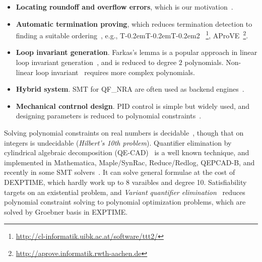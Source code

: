 \documentclass[runningheads,a4paper,oribibl]{llncs}
\newcommand\TTTT{%
 \textsf{T\kern-0.2em\raisebox{-0.3em}T\kern-0.2emT\kern-0.2em\raisebox{-0.3em}2}%
}
\begin{document}
\begin{itemize}
\item {\bf Locating roundoff and overflow errors}, 
which is our motivation~\cite{Ngoc:2009:ORE:1685167.1685421,Ngoc:2010:CRE:1858996.1859056}. 

\item {\bf Automatic termination proving}, 
which reduces termination detection to finding a suitable ordering~\cite{Lucas:2008:CCS:1361735.1361760}, 
e.g., \TTTT~\footnote{\url{http://cl-informatik.uibk.ac.at/software/ttt2/}}, 
AProVE~\footnote{\url{http://aprove.informatik.rwth-aachen.de}}. 

\item {\bf Loop invariant generation}. 
Farkas's lemma is a popular approach in linear loop invariant generation~\cite{Colon}, 
and is reduced to degree $2$ polynomials. 
Non-linear loop invariant~\cite{Sankaranarayanan:2004:NLI:982962.964028} requires more complex polynomials.

\item {\bf Hybrid system}. SMT for QF\_NRA are often used as backend engines~\cite{Sankaranarayanan04constructinginvariants}. 

\item {\bf Mechanical contrnol design}. 
PID control is simple but widely used, and designing parameters is 
reduced to polynomial constraints~\cite{control}. 
\end{itemize}	

Solving polynomial constraints on real numbers is decidable~\cite{tarski}, 
though that on integers is undecidable ({\em Hilbert's 10th problem}). 
Quantifier elimination by cylindrical algebraic decomposition (QE-CAD)~\cite{qecad} 
is a well known technique, and 
implemented in Mathematica, Maple/SynRac, Reduce/Redlog, QEPCAD-B, and recently 
in some SMT solvers~\cite{Jovanovic13}. 
It can solve general formulae at the cost of DEXPTIME, which hardly work up to 8 varaibles and degree 10.
Satisfiability targets on an existential problem, and 
{\em Variant quantifier elimination}~\cite{MohabJSC12} reduces polynomial constraint solving to 
polynomial optimization problems, which are solved by Groebner basis in EXPTIME. 
\end{document}
